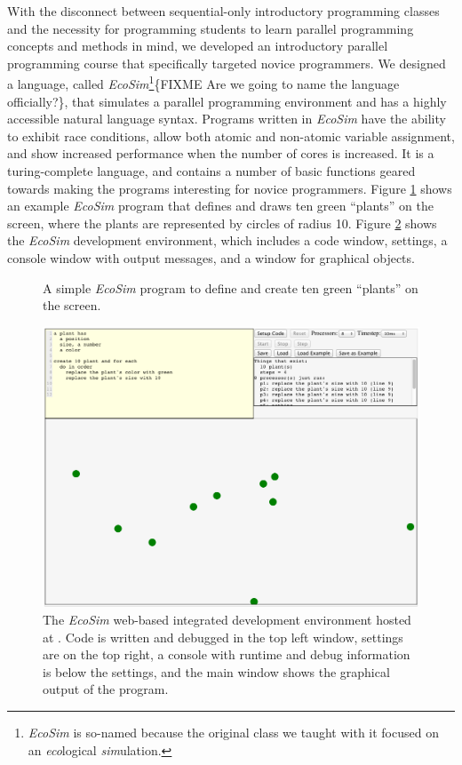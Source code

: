 \documentclass{sig-alternate}
\newcommand{\FIXME}[1]{{\color{red}\{FIXME #1\}}}
\newcommand{\INDSTATE}[1][1]{\STATE\hspace{#1\algorithmicindent}}
\begin{document}
With the disconnect between sequential-only introductory programming classes and the necessity for
programming students to learn parallel programming concepts and methods in mind, we developed
an introductory parallel programming course that specifically targeted novice programmers.  We
designed a language, called \emph{EcoSim}\footnote{\emph{EcoSim} is so-named because the original 
class we taught with it focused on an \emph{eco}logical \emph{sim}ulation.}\FIXME{Are we going to 
name the language officially?}, that simulates a parallel programming environment and has a highly
accessible natural language syntax.  Programs written in \emph{EcoSim} have the ability to exhibit race 
conditions, allow both atomic and non-atomic variable assignment, and show increased performance
when the number of cores is increased.  It is a turing-complete language, and
contains a number of basic functions geared towards making the programs interesting for novice
programmers.  Figure \ref{fig:exampleProgram} shows an example \emph{EcoSim} program that defines and
draws ten green ``plants'' on the screen, where the plants are represented by circles of radius 10.
Figure \ref{fig:ecosimScreencap} shows the \emph{EcoSim} development environment, which includes
a code window, settings, a console window with output messages, and a window for graphical
objects.
\begin{figure}
\begin{algorithmic}[1]
  \INDSTATE{a position}
  \INDSTATE{size, a number}
  \INDSTATE{a color}
\STATE{}
  \INDSTATE{do in order}
  \INDSTATE{replace the plant's color with green}
  \INDSTATE{replace the plant's size with 10}
\end{algorithmic} 
\caption{A simple \emph{EcoSim} program to define and create ten green ``plants'' on the screen.}
\label{fig:exampleProgram} 
\end{figure}

\begin{figure}
\centerline{\includegraphics[width=.49\textwidth]{figures/EcosimScreencap.png}}
\caption{The \emph{EcoSim} web-based integrated development environment hosted at
\ecosimPath{}.  Code is written and debugged in the top left window, settings are on
the top right, a console with runtime and debug information is below the settings, and the
main window shows the graphical output of the program.}
\label{fig:ecosimScreencap}
\end{figure}
\end{document}
